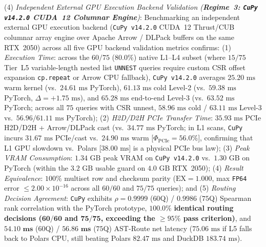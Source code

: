 \documentclass[10pt,a4paper]{article}
\begin{document}
(4) \emph{Independent External GPU Execution Backend Validation (\textbf{Regime~3: \texttt{CuPy v14.2.0} CUDA~12 Columnar Engine})}: Benchmarking an independent external GPU execution backend (\texttt{CuPy v14.2.0} CUDA~12 Thrust/CUB columnar array engine over Apache Arrow / DLPack buffers on the same RTX~2050) across all five GPU backend validation metrics confirms: (1) \emph{Execution Time}: across the $60/75$ ($80.0\%$) native L1--L4 subset (where $15/75$ Tier~L5 variable-length nested list \texttt{UNNEST} queries require custom CSR offset expansion \texttt{cp.repeat} or Arrow CPU fallback), \texttt{CuPy v14.2.0} averages $25.20\text{ ms}$ warm kernel (vs.\ $24.61\text{ ms}$ PyTorch), $61.13\text{ ms}$ cold Level-2 (vs.\ $59.38\text{ ms}$ PyTorch, $\Delta = +1.75\text{ ms}$), and $65.28\text{ ms}$ end-to-end Level-3 (vs.\ $63.52\text{ ms}$ PyTorch; across all $75$ queries with CSR unnest, $58.96\text{ ms}$ cold / $63.11\text{ ms}$ Level-3 vs.\ $56.96 / 61.11\text{ ms}$ PyTorch); (2) \emph{H2D/D2H PCIe Transfer Time}: $35.93\text{ ms}$ PCIe H2D/D2H + Arrow/DLPack cast (vs.\ $34.77\text{ ms}$ PyTorch; in L1 scans, \texttt{CuPy} incurs $31.67\text{ ms}$ PCIe/cast vs.\ $24.90\text{ ms}$ warm [$\Phi_{\text{PCIe}}=56.0\%$], confirming that L1 GPU slowdown vs.\ Polars [$38.00\text{ ms}$] is a physical PCIe bus law); (3) \emph{Peak VRAM Consumption}: $1.34\text{ GB}$ peak VRAM on \texttt{CuPy v14.2.0} vs.\ $1.30\text{ GB}$ on PyTorch (within the $3.2\text{ GB}$ usable guard on $4.0\text{ GB}$ RTX~2050); (4) \emph{Result Equivalence}: $100\%$ multiset row and checksum parity ($\text{EX}=1.000$, max \texttt{FP64} error $\le 2.00\times 10^{-16}$ across all $60/60$ and $75/75$ queries); and (5) \emph{Routing Decision Agreement}: \texttt{CuPy} exhibits $\rho=0.9999$ ($60$Q) / $0.9986$ ($75$Q) Spearman rank correlation with the PyTorch prototype, $\mathbf{100.0\%}$ \textbf{identical routing decisions ($\mathbf{60/60}$ and $\mathbf{75/75}$, exceeding the $\ge 95\%$ pass criterion)}, and $\mathbf{54.10\text{ ms}}$ ($60$Q) / $\mathbf{56.86\text{ ms}}$ ($75$Q) AST-Route net latency ($75.06\text{ ms}$ if L5 falls back to Polars CPU, still beating Polars $82.47\text{ ms}$ and DuckDB $183.74\text{ ms}$).

\label{sec:v9_sec3_3_consistency_audit}\label{sec:v9_sec3_4_csci_generalizability_audit}\label{sec:v9_roadmap_v86_closure}

\vspace{-6pt}
\end{document}
